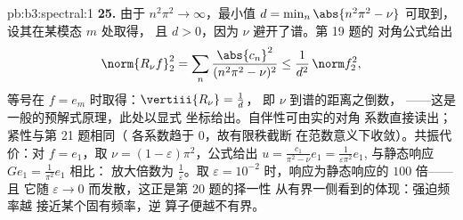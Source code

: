 \begin{solution}{pb:b3:spectral:1}
\textbf{25.} 由于 $n^2\pi^2 \to \infty$，最小值 $d =
\min_n\abs{n^2\pi^2 - \nu}$ 可取到，设其在某模态 $m$ 处取得，
且 $d > 0$，因为 $\nu$ 避开了谱。第 19 题的
对角公式给出
\[
\norm{R_\nu f}_2^2 =
\sum_n\frac{\abs{c_n}^2}{(n^2\pi^2 - \nu)^2}
\leq \frac1{d^2}\,\norm f_2^2,
\]
等号在 $f = e_m$ 时取得：$\vertiii{R_\nu} = \frac1d$，
即 $\nu$ 到谱的距离之倒数，
——这是一般的预解式原理，此处以显式
坐标给出。自伴性可由实的对角
系数直接读出；紧性与第 21 题相同（
各系数趋于 $0$，故有限秩截断
在范数意义下收敛）。共振代价：对 $f = e_1$，取 $\nu =
(1-\varepsilon)\pi^2$，公式给出 $u =
\frac{c_1}{\pi^2 - \nu}e_1 = \frac1{\varepsilon\pi^2}e_1$,
与静态响应 $Ge_1 = \frac1{\pi^2}e_1$ 相比：
放大倍数为 $\frac1\varepsilon$。取 $\varepsilon =
10^{-2}$ 时，响应为静态响应的 $100$ 倍——且
它随 $\varepsilon \to 0$ 而发散，这正是第 20 题的择一性
从有界一侧看到的体现：强迫频率越
接近某个固有频率，逆
算子便越不有界。
\end{solution}
